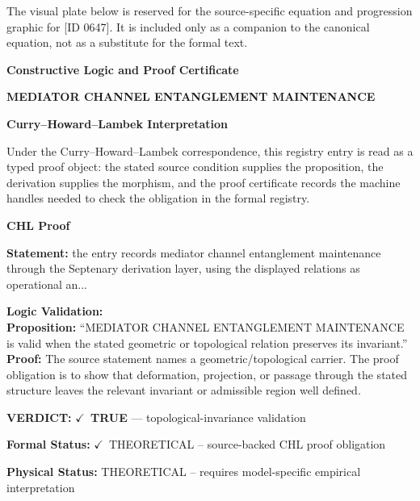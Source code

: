 \begingroup\footnotesize\sloppy
The visual plate below is reserved for the source-specific equation and progression graphic for [ID 0647]. It is included only as a companion to the canonical equation, not as a substitute for the formal text.
\par\endgroup
\ifTZPDarkEdition
{}
\fi

\clearpage
\begingroup\tzpsupportsetup
\noindent\textbf{\fontsize{10.8pt}{12.8pt}\selectfont [ID 0647] Constructive Logic and Proof Certificate}\par
\noindent\textbf{\fontsize{10pt}{12pt}\selectfont MEDIATOR CHANNEL ENTANGLEMENT MAINTENANCE}\par
\vspace{0.45em}
\begingroup
\footnotesize
\setlength{\parskip}{0.22em}
\setlength{\parindent}{0pt}
\noindent\textbf{Curry--Howard--Lambek Interpretation}\par
Under the Curry--Howard--Lambek correspondence, this registry entry is read as a typed proof
object: the stated source condition supplies the proposition, the derivation supplies the
morphism, and the proof certificate records the machine handles needed to check the obligation
in the formal registry.

\vspace{0.45em}
\noindent\textbf{CHL Proof}\par
\textbf{Statement:} the entry records mediator channel entanglement maintenance through the Septenary
derivation layer, using the displayed relations as operational an...

\textbf{Logic Validation:}\\
\textbf{Proposition:} ``MEDIATOR CHANNEL ENTANGLEMENT MAINTENANCE is valid when the stated geometric or
topological relation preserves its invariant.''\\
\textbf{Proof:} The source statement names a geometric/topological carrier. The proof obligation is to
show that deformation, projection, or passage through the stated structure leaves the
relevant invariant or admissible region well defined.

\textbf{VERDICT:} \ensuremath{\checkmark}\ \textbf{TRUE} --- topological-invariance validation

\textbf{Formal Status:} \ensuremath{\checkmark}\ THEORETICAL -- source-backed CHL proof obligation

\textbf{Physical Status:} THEORETICAL -- requires model-specific empirical interpretation
\par\vspace{0.45em}
\par
\ifTZPDarkEdition
{}
\fi
\endgroup
\endgroup
